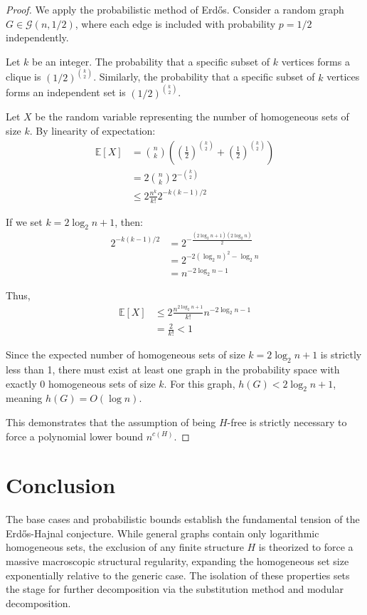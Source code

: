 \documentclass[12pt, a4paper]{article}
\begin{document}
\begin{proof}
We apply the probabilistic method of Erd\H{o}s. Consider a random graph $G \in \mathcal{G}(n, 1/2)$, where each edge is included with probability $p = 1/2$ independently.

Let $k$ be an integer. The probability that a specific subset of $k$ vertices forms a clique is $(1/2)^{\binom{k}{2}}$.
Similarly, the probability that a specific subset of $k$ vertices forms an independent set is $(1/2)^{\binom{k}{2}}$.

Let $X$ be the random variable representing the number of homogeneous sets of size $k$. By linearity of expectation:
\begin{align*}
\mathbb{E}[X] &= \binom{n}{k} \left( \left(\frac{1}{2}\right)^{\binom{k}{2}} + \left(\frac{1}{2}\right)^{\binom{k}{2}} \right) \\
&= 2 \binom{n}{k} 2^{-\binom{k}{2}} \\
&\leq 2 \frac{n^k}{k!} 2^{-k(k-1)/2}
\end{align*}

If we set $k = 2 \log_2 n + 1$, then:
\begin{align*}
2^{-k(k-1)/2} &= 2^{-\frac{(2 \log_2 n + 1)(2 \log_2 n)}{2}} \\
&= 2^{-2(\log_2 n)^2 - \log_2 n} \\
&= n^{-2\log_2 n - 1}
\end{align*}

Thus,
\begin{align*}
\mathbb{E}[X] &\leq 2 \frac{n^{2\log_2 n + 1}}{k!} n^{-2\log_2 n - 1} \\
&= \frac{2}{k!} < 1
\end{align*}

Since the expected number of homogeneous sets of size $k = 2\log_2 n + 1$ is strictly less than 1, there must exist at least one graph in the probability space with exactly 0 homogeneous sets of size $k$.
For this graph, $h(G) < 2 \log_2 n + 1$, meaning $h(G) = O(\log n)$.

This demonstrates that the assumption of being $H$-free is strictly necessary to force a polynomial lower bound $n^{c(H)}$.
\end{proof}

\section{Conclusion}

The base cases and probabilistic bounds establish the fundamental tension of the Erd\H{o}s-Hajnal conjecture. While general graphs contain only logarithmic homogeneous sets, the exclusion of any finite structure $H$ is theorized to force a massive macroscopic structural regularity, expanding the homogeneous set size exponentially relative to the generic case. The isolation of these properties sets the stage for further decomposition via the substitution method and modular decomposition.
\end{document}
